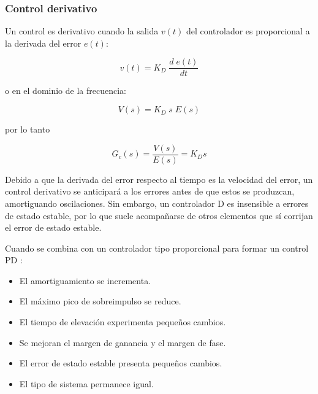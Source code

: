 %
%


\subsubsection{Control derivativo}%
\label{sec:control-d}
Un control es derivativo cuando la salida $v(t)$ del controlador es proporcional a la derivada del error $e(t)$:

\begin{equation*}
v(t) = K_{D}\;\frac{d\;e(t)}{dt}
\end{equation*}

\noindent o en el dominio de la frecuencia:

\begin{equation*}
V(s) = K_{D}\;s\;E(s)
\end{equation*}

\noindent por lo tanto

\begin{equation}
G_{c}(s) = \frac{V(s)}{E(s)} = K_{D}s
\label{eqn:ctrl-d}
\end{equation}

Debido a que la derivada del error respecto al tiempo es la velocidad del error, un control derivativo se anticipará a los errores antes de que estos se produzcan, amortiguando oscilaciones.
Sin embargo, un controlador D es insensible a errores de estado estable, por lo que suele acompañarse de otros elementos que sí corrijan el error de estado estable.

Cuando se combina con un controlador tipo proporcional para formar un control PD :
\begin{itemize}[noitemsep]
	\item El amortiguamiento se incrementa.
	\item El máximo pico de sobreimpulso se reduce.
	\item El tiempo de elevación experimenta pequeños cambios.
	\item Se mejoran el margen de ganancia y el margen de fase.
	\item El error de estado estable presenta pequeños cambios.
	\item El tipo de sistema permanece igual.
\end{itemize}

